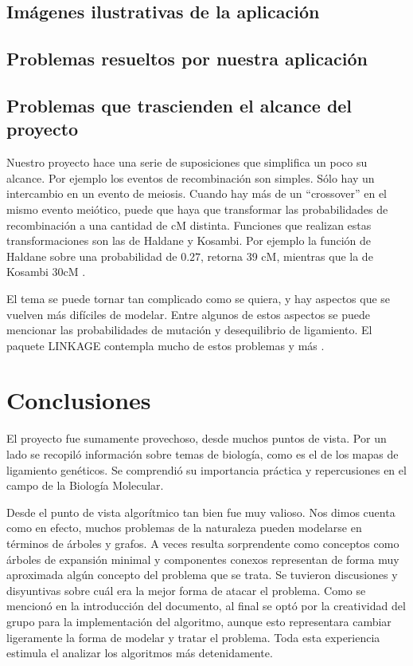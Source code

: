 \documentclass{article}
\begin{document}
	
	
	\subsection{Imágenes ilustrativas de la aplicación}
	
	
	\subsection{Problemas resueltos por nuestra aplicación}
	
	
	\subsection{Problemas que trascienden el alcance del proyecto}
	
	Nuestro proyecto hace una serie de suposiciones que simplifica un poco su alcance. Por ejemplo los eventos de recombinación son simples. Sólo hay un intercambio en un evento de meiosis. Cuando hay más de un ``crossover'' en el mismo evento meiótico, puede que haya que transformar las probabilidades de recombinación a una cantidad de cM distinta. Funciones que realizan estas transformaciones son las de Haldane y Kosambi. Por ejemplo la función de Haldane sobre una probabilidad de $0.27$, retorna 39 cM, mientras que la de Kosambi 30cM \cite{terwilliger1994handbook}.
	
	El tema se puede tornar tan complicado como se quiera, y hay aspectos que se vuelven más difíciles de modelar. Entre algunos de estos aspectos se puede mencionar las probabilidades de mutación y desequilibrio de ligamiento. El paquete LINKAGE contempla mucho de estos problemas y más \cite{terwilliger1994handbook}.
	
	\section{Conclusiones}
	
	El proyecto fue sumamente provechoso, desde muchos puntos de vista. Por un lado se recopiló información sobre temas de biología, como es el de los mapas de ligamiento genéticos. Se comprendió su importancia práctica y repercusiones en el campo de la Biología Molecular.
	
	Desde el punto de vista algorítmico tan bien fue muy valioso. Nos dimos cuenta como en efecto, muchos problemas de la naturaleza pueden modelarse en términos de árboles y grafos. A veces resulta sorprendente como conceptos como árboles de expansión minimal y componentes conexos representan de forma muy aproximada algún concepto del problema que se trata. Se tuvieron discusiones y disyuntivas sobre cuál era la mejor forma de atacar el problema. Como se mencionó en la introducción del documento, al final se optó por la creatividad del grupo para la implementación del algoritmo, aunque esto representara cambiar ligeramente la forma de modelar y tratar el problema. Toda esta experiencia estimula el analizar los algoritmos más detenidamente.
	
\end{document}
